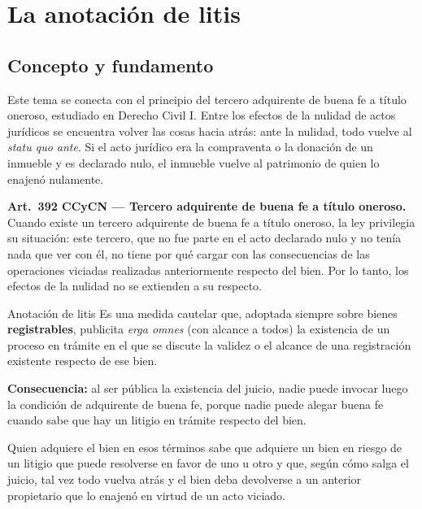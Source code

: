 \documentclass[12pt,oneside]{book}
\begin{document}
\section{La anotación de litis}

\subsection{Concepto y fundamento}

Este tema se conecta con el principio del tercero adquirente de buena fe a título oneroso, estudiado en Derecho Civil I. Entre los efectos de la nulidad de actos jurídicos se encuentra volver las cosas hacia atrás: ante la nulidad, todo vuelve al \textit{statu quo ante}. Si el acto jurídico era la compraventa o la donación de un inmueble y es declarado nulo, el inmueble vuelve al patrimonio de quien lo enajenó nulamente.

\begin{important}
\textbf{Art.\ 392 CCyCN --- Tercero adquirente de buena fe a título oneroso.} Cuando existe un tercero adquirente de buena fe a título oneroso, la ley privilegia su situación: este tercero, que no fue parte en el acto declarado nulo y no tenía nada que ver con él, no tiene por qué cargar con las consecuencias de las operaciones viciadas realizadas anteriormente respecto del bien. Por lo tanto, los efectos de la nulidad no se extienden a su respecto.
\end{important}

\begin{definition}{Anotación de litis}
Es una medida cautelar que, adoptada siempre sobre bienes \textbf{registrables}, publicita \textit{erga omnes} (con alcance a todos) la existencia de un proceso en trámite en el que se discute la validez o el alcance de una registración existente respecto de ese bien.

\textbf{Consecuencia:} al ser pública la existencia del juicio, nadie puede invocar luego la condición de adquirente de buena fe, porque nadie puede alegar buena fe cuando sabe que hay un litigio en trámite respecto del bien.
\end{definition}

Quien adquiere el bien en esos términos sabe que adquiere un bien en riesgo de un litigio que puede resolverse en favor de uno u otro y que, según cómo salga el juicio, tal vez todo vuelva atrás y el bien deba devolverse a un anterior propietario que lo enajenó en virtud de un acto viciado.
\end{document}

